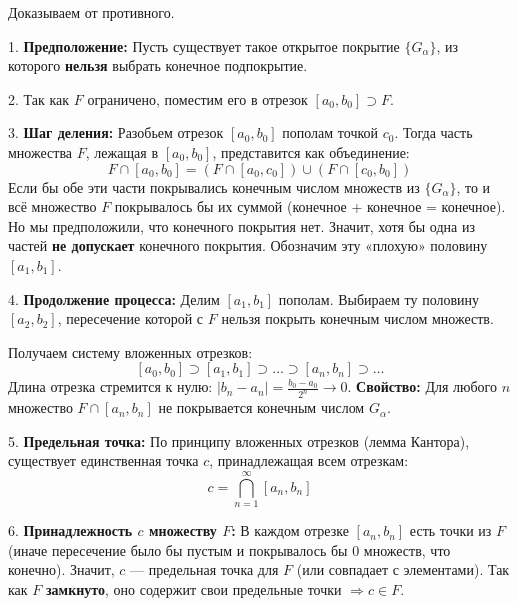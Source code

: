 \begin{tcolorbox}[title=Доказательство (Метод вложенных отрезков)]
    Доказываем от противного.
    
    1. \textbf{Предположение:} Пусть существует такое открытое покрытие $\{G_\alpha\}$, из которого \textbf{нельзя} выбрать конечное подпокрытие.
    
    2. Так как $F$ ограничено, поместим его в отрезок $[a_0, b_0] \supset F$.
    
    3. \textbf{Шаг деления:} Разобьем отрезок $[a_0, b_0]$ пополам точкой $c_0$.
    Тогда часть множества $F$, лежащая в $[a_0, b_0]$, представится как объединение:
    \[ F \cap [a_0, b_0] = (F \cap [a_0, c_0]) \cup (F \cap [c_0, b_0]) \]
    Если бы обе эти части покрывались конечным числом множеств из $\{G_\alpha\}$, то и всё множество $F$ покрывалось бы их суммой (конечное + конечное = конечное).
    Но мы предположили, что конечного покрытия нет. Значит, хотя бы одна из частей \textbf{не допускает} конечного покрытия.
    Обозначим эту «плохую» половину $[a_1, b_1]$.
    
    4. \textbf{Продолжение процесса:}
    Делим $[a_1, b_1]$ пополам. Выбираем ту половину $[a_2, b_2]$, пересечение которой с $F$ нельзя покрыть конечным числом множеств.
    
    Получаем систему вложенных отрезков:
    \[ [a_0, b_0] \supset [a_1, b_1] \supset \dots \supset [a_n, b_n] \supset \dots \]
    Длина отрезка стремится к нулю: $|b_n - a_n| = \frac{b_0-a_0}{2^n} \to 0$.
    \textbf{Свойство:} Для любого $n$ множество $F \cap [a_n, b_n]$ не покрывается конечным числом $G_\alpha$.
    
    5. \textbf{Предельная точка:}
    По принципу вложенных отрезков (лемма Кантора), существует единственная точка $c$, принадлежащая всем отрезкам:
    \[ c = \bigcap_{n=1}^\infty [a_n, b_n] \]
    
    6. \textbf{Принадлежность $c$ множеству $F$:}
    В каждом отрезке $[a_n, b_n]$ есть точки из $F$ (иначе пересечение было бы пустым и покрывалось бы 0 множеств, что конечно). Значит, $c$ — предельная точка для $F$ (или совпадает с элементами). Так как $F$ \textbf{замкнуто}, оно содержит свои предельные точки $\Rightarrow c \in F$.
    

\end{tcolorbox}
